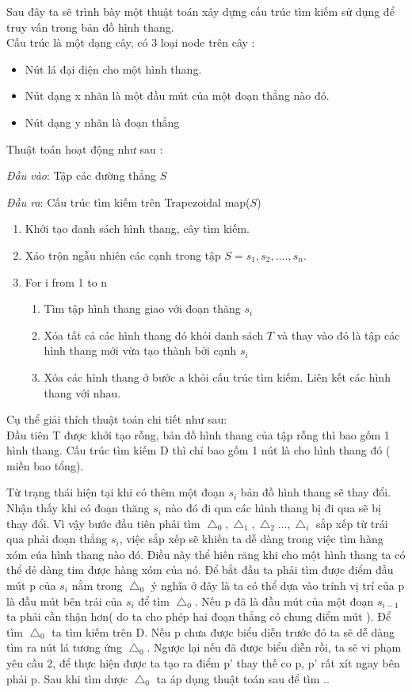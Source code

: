 \documentclass[a4paper,12pt]{report}
\begin{document}
Sau đây ta sẽ trình bày một thuật toán xây dựng cấu trúc tìm kiếm sử dụng để truy vấn trong bản đồ hình thang.\\

Cấu trúc là một dạng cây, có 3 loại node trên cây :
\begin{itemize}
\item Nút lá đại diện cho một hình thang.
\item Nút dạng x nhãn là một đầu mút của một đoạn thẳng nào đó.
\item Nút dạng y nhãn là đoạn thẳng
\end{itemize}

Thuật toán hoạt động như sau :

\emph{Đầu vào}: Tập các đường thẳng $S$

\emph{Đầu ra}: Cấu trúc tìm kiếm trên Trapezoidal map($S$)

\begin{enumerate}
\item Khởi tạo danh sách hình thang, cây tìm kiếm.
\item Xáo trộn  ngẫu nhiên các cạnh trong tập $S = {s_1, s_2, ...., s_n}$.
\item For i from 1 to n  
\begin{enumerate}
\item Tìm tập hình thang giao với đoạn thăng $s_i$
\item Xóa tất cả các hình thang đó khỏi danh sách $T$ và thay vào đó là tập các hình thang mới vừa tạo thành bởi cạnh $s_i$
\item Xóa các hình thang ở bước a khỏi cấu trúc tìm kiếm. Liên kết các hình thang với nhau.
\end{enumerate}
\end{enumerate}
Cụ thể giải thích thuật toán chi tiết như sau: \\

Đầu tiên T được khởi tạo rỗng, bản đồ hình thang của tập rỗng thì bao gốm 1 hình thang. Cấu trúc tìm kiếm D thì chỉ bao gốm 1 nút là cho hình thang đó ( miền bao tổng). 

Từ trạng thái hiện tại khi có thêm một đoạn $s_i$ bản đồ hình thang sẽ thay đổi.
 Nhận thấy khi có đoạn thăng $s_i$ nào đó đi qua các hình thang bị đi qua sẽ bị thay đổi. Vì vậy bước đầu tiên phải tìm $\bigtriangleup_0,\bigtriangleup_1, \bigtriangleup_2..., \bigtriangleup_i $ sắp xếp từ trái qua phải đoạn thẳng $s_i$, việc sắp xếp sẽ khiến ta dễ dàng trong việc tìm hàng xóm cúa hình thang nào đó. Điều này thể hiên răng khi cho một hình thang ta có thể dẻ dàng tim được hàng xóm của nó. 
Để bắt đầu ta phải tìm được điểm đầu mút p của $s_i$ nằm trong $\bigtriangleup_0$
ý nghĩa ở đây là ta có thể dựa vào trính vị trí của p là đầu mút bên trái của $s_i$ để tìm $\bigtriangleup_0$. Nếu p đã là đầu mút của một đoạn $s_{i-1}$ ta phải cần thận hơn( do ta cho phép hai đoạn thẳng có chung điểm mút ). Để tìm  $\bigtriangleup_0$ ta tìm kiếm trên D. Nếu p chưa được biểu diễn trước đó ta sẽ dễ dàng tìm ra nút lá tương ứng $\bigtriangleup_0$. Ngược lại nếu đã được biểu diễn rồi, ta sẽ vi phạm yêu cầu 2, để thực hiện được ta tạo ra điểm p' thay thế co p, p' rất xít ngay bên phải p.
Sau khi tìm dược $\bigtriangleup_0$ ta áp dụng thuật toán sau để tìm ..
\end{document}
